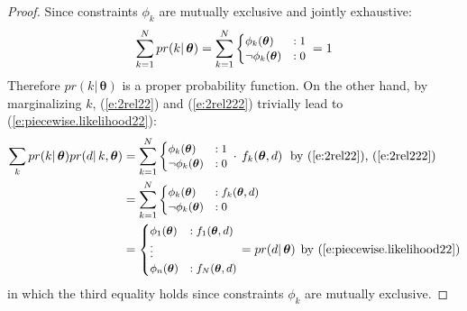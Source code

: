 \begin{proof}
Since constraints $\phi_k$ are mutually exclusive and jointly exhaustive: 
$$\sum_{k= 1}^N pr(k | \, \boldsymbol\theta) = 
\sum_{k=1}^N
{\footnotesize
\begin{cases}
\phi_k(\boldsymbol\theta)   &: 1\\
\neg \phi_k(\boldsymbol\theta)  &: 0
\end{cases}
}%
\, =1
$$
Therefore $pr(k | \, \boldsymbol\theta)$ is a proper probability function. 
On the other hand, by marginalizing $k$, (\ref{e:2rel22}) and (\ref{e:2rel222}) trivially lead to (\ref{e:piecewise.likelihood22}):
{\small 
\begin{align*}
\sum_{k} pr(k | \, \boldsymbol\theta)pr(d | \, k, \boldsymbol\theta) 
&= 
\sum_{k=1}^N  
{\footnotesize
\begin{cases}
\phi_k(\boldsymbol\theta)  &: 1\\
\neg \phi_k(\boldsymbol\theta) &: 0
\end{cases}
}%
\, \cdot \, f_k(\boldsymbol \theta, d)
&&\text{\hspace{-5mm}by (\ref{e:2rel22}), (\ref{e:2rel222})}
\\
&=
\sum_{k=1}^N 
{\footnotesize
\begin{cases}
		\phi_k(\boldsymbol\theta)  &: f_k(\boldsymbol\theta, d)\\
\neg 	\phi_k(\boldsymbol\theta)  &: 0
\end{cases}
}%
\nonumber \\
&= {\footnotesize
\begin{cases}
\phi_1(\boldsymbol\theta)  &: f_1(\boldsymbol\theta, d)\\
\vdots\\
\phi_n(\boldsymbol\theta)  &: f_N(\boldsymbol\theta, d)
\end{cases}
}%
= pr(d | \, \boldsymbol\theta) 
&&\text{\hspace{-2mm}by (\ref{e:piecewise.likelihood22})}
\end{align*}}
in which the third equality holds since constraints $\phi_k$ are mutually exclusive. 
\end{proof}
 
